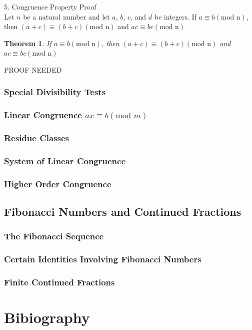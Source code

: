 \documentclass{book}
\newtheorem{theorem}{Theorem}[section]
\theoremstyle{definition}
\theoremstyle{remark}
\begin{document}
5. Congruence Property Proof \\
Let $n$ be a natural number and let $a$, $b$, $c$, and $d$ be integers. If $a \equiv b (\text{mod n})$, then $(a + c) \equiv (b + c) (\text{mod n})$ and $ac \equiv bc (\text{mod n})$ \\

\begin{tcolorbox}
	\begin{theorem}
		If $a \equiv b (\text{mod n})$, then $(a + c) \equiv (b + c) (\text{mod n})$ and $ac \equiv bc (\text{mod n})$
	\end{theorem}
\end{tcolorbox}

PROOF NEEDED


\newpage
\subsection{Special Divisibility Tests}
\subsection{Linear Congruence $ax \equiv b (\text{mod }m)$}
\subsection{Residue Classes}
\subsection{System of Linear Congruence}
\subsection{Higher Order Congruence}

\newpage
\section{Fibonacci Numbers and Continued Fractions}
\subsection{The Fibonacci Sequence}
\subsection{Certain Identities Involving Fibonacci Numbers}
\subsection{Finite Continued Fractions}





\newpage
\chapter{Bibiography}
\printbibliography
\end{document}
